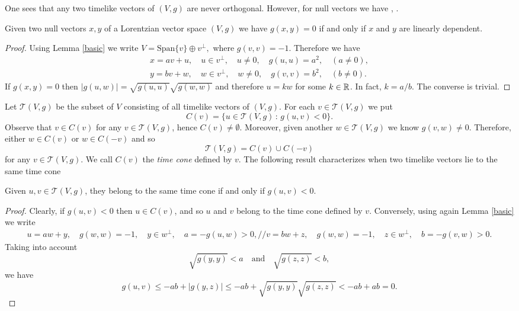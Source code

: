 One sees that any two timelike vectors of $(V,g)$ are never orthogonal.
However, for null vectors we have  \cite[Cor. 1.1.5]{sachs77}, \cite[p. 155]{oneill83}.

\begin{proposition} Given two null vectors $x,y$ of a Lorentzian vector space $(V,g)$ we have
$g(x,y)=0$ if and only if $x$ and $y$ are linearly dependent.
\end{proposition}

\begin{proof}
    Using Lemma \ref{basic} we write $V=\mathrm{Span}\{v\}\oplus v^{\perp},$ where $g(v,v)=-1$. Therefore we have
    \begin{align*}
        x=av+u, \quad u\in v^{\perp}, \quad u\neq 0, \quad g(u,u)=a^2, \quad (a\neq 0),\\
        y=bv+w, \quad w\in v^{\perp}, \quad w\neq 0, \quad g(v,v)=b^2, \quad (b\neq 0).
    \end{align*}
    If $g(x,y)=0$ then $\mid g(u,w)\mid = \sqrt{g(u,u)}\sqrt{g(w,w)}$ and therefore $u=kw$ for some $k\in \mathbb{R}$. In fact, $k=a/b$. The converse is trivial.
\end{proof}

Let $\mathcal{T}(V,g)$ be the subset of $V$ consisting of all timelike vectors of $(V,g)$. For each $v\in \mathcal{T}(V,g)$ we put
\[
C(v)=\{u\in\mathcal{T}(V,g)\, : \, g(u,v)<0 \}.
\]
Observe that $v\in C(v)$ for any $v\in \mathcal{T}(V,g)$, hence $C(v)\neq \emptyset$. Moreover, given another $w\in \mathcal{T}(V,g)$
we know $g(v,w)\neq 0$. Therefore, either $w\in C(v)$ or $w\in C(-v)$ and so
\[
\mathcal{T}(V,g)=C(v) \cup C(-v)
\]
for any $v\in \mathcal{T}(V,g)$. We call $C(v)$ the \emph{time cone} defined by $v$. The following result characterizes
when two timelike vectors lie to the same time cone \cite[Lemma 5.29]{oneill83}

\begin{lemma}\label{time_cone}
Given $u,v\in \mathcal{T}(V,g)$, they belong to the same time cone if and only if $g(u,v)<0$.
\end{lemma}

\begin{proof}
    Clearly, if $g(u,v)<0$ then $u\in C(v)$, and so $u$ and $v$ belong to the time cone defined by $v$. Conversely, using again Lemma \ref{basic} we write
    \begin{align*}
        u=aw+y, \quad g(w,w)=-1, \quad y\in w^{\perp}, \quad a=-g(u,w)>0,//
        v=bw+z, \quad g(w,w)=-1, \quad z\in w^{\perp}, \quad b=-g(v,w)>0.
    \end{align*}
    Taking into account
    \[
    \sqrt{g(y,y)}<a \quad \mathrm{and} \quad \sqrt{g(z,z)}<b,
    \]
    we have
    \[
    g(u,v)\leq -ab+\mid g(y,z)\mid \leq -ab + \sqrt{g(y,y)}\sqrt{g(z,z)}<-ab+ab=0.
    \]
\end{proof}

